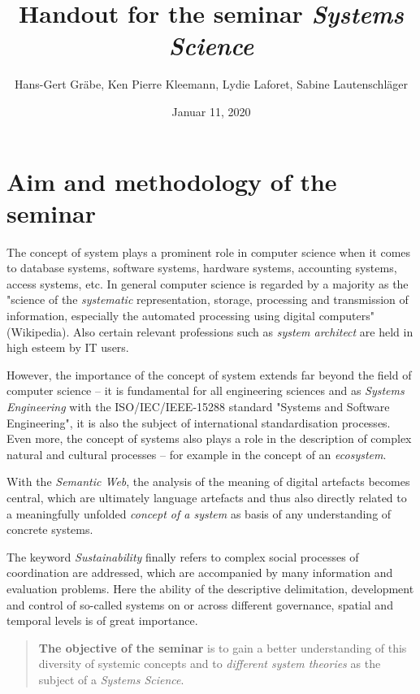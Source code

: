 \documentclass[11pt,a4paper]{article}
\title{Handout for the seminar \emph{Systems Science}}
\author{Hans-Gert Gr\"abe, Ken Pierre Kleemann, Lydie Laforet, Sabine
  Lautenschläger}
\date{Januar 11, 2020}
\begin{document}
\maketitle

\section{Aim and methodology of the seminar}

The concept of system plays a prominent role in computer science when it comes
to database systems, software systems, hardware systems, accounting systems,
access systems, etc.  In general computer science is regarded by a majority as
the "science of the \emph{systematic} representation, storage, processing and
transmission of information, especially the automated processing using digital
computers" (Wikipedia).  Also certain relevant professions such as
\emph{system architect} are held in high esteem by IT users.  

However, the importance of the concept of system extends far beyond the field
of computer science -- it is fundamental for all engineering sciences and as
\emph{Systems Engineering} with the ISO/IEC/IEEE-15288 standard "Systems and
Software Engineering", it is also the subject of international standardisation
processes.  Even more, the concept of systems also plays a role in the
description of complex natural and cultural processes -- for example in the
concept of an \emph{ecosystem}.

With the \emph{Semantic Web}, the analysis of the meaning of digital artefacts
becomes central, which are ultimately language artefacts and thus also
directly related to a meaningfully unfolded \emph{concept of a system} as
basis of any understanding of concrete systems.

The keyword \emph{Sustainability} finally refers to complex social processes
of coordination are addressed, which are accompanied by many information and
evaluation problems. Here the ability of the descriptive delimitation,
development and control of so-called systems on or across different
governance, spatial and temporal levels is of great importance. 

\begin{quote}
  \textbf{The objective of the seminar} is to gain a better understanding of
  this diversity of systemic concepts and to \emph{different system theories}
  as the subject of a \emph{Systems Science}.
\end{quote}
\end{document}
